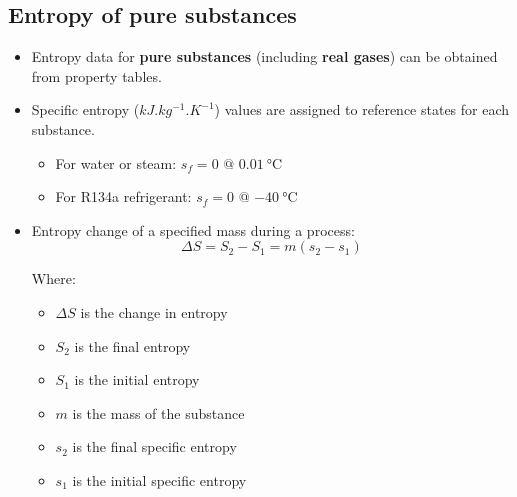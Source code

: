 \documentclass[11pt]{article}
\begin{document}
\subsection{Entropy of pure substances}
\label{sec:orgdd20790}
\begin{itemize}
\item Entropy data for \textbf{pure substances} (including \textbf{real gases}) can be obtained from property tables.
\item Specific entropy (\(\unit{kJ.kg^{-1}.K^{-1}}\)) values are assigned to reference states for each substance.
\begin{itemize}
\item For water or steam: \(s_f = 0 \text{ @ } \qty{0.01}{\degreeCelsius}\)
\item For R134a refrigerant: \(s_f = 0 \text{ @ } \qty{-40}{\degreeCelsius}\)
\end{itemize}
\item Entropy change of a specified mass during a process:
\[\Delta S = S_2 - S_1 = m(s_2 - s_1)\]

Where:
\begin{itemize}
\item \(\Delta S\) is the change in entropy
\item \(S_2\) is the final entropy
\item \(S_1\) is the initial entropy
\item \(m\) is the mass of the substance
\item \(s_2\) is the final specific entropy
\item \(s_1\) is the initial specific entropy
\end{itemize}
\end{itemize}

 \newpage
\end{document}
